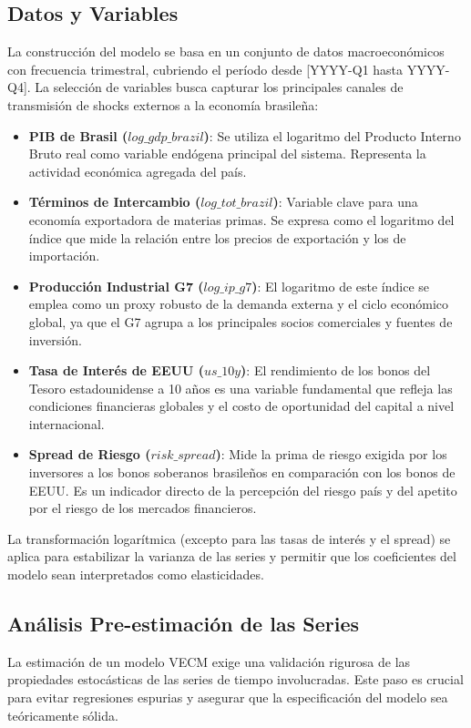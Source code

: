 \documentclass[12pt, a4paper]{article}
\begin{document}
\subsection{Datos y Variables}
La construcción del modelo se basa en un conjunto de datos macroeconómicos con frecuencia trimestral, cubriendo el período desde [YYYY-Q1 hasta YYYY-Q4]. La selección de variables busca capturar los principales canales de transmisión de shocks externos a la economía brasileña:
\begin{itemize}
    \item \textbf{PIB de Brasil ($log\_gdp\_brazil$)}: Se utiliza el logaritmo del Producto Interno Bruto real como variable endógena principal del sistema. Representa la actividad económica agregada del país.
    \item \textbf{Términos de Intercambio ($log\_tot\_brazil$)}: Variable clave para una economía exportadora de materias primas. Se expresa como el logaritmo del índice que mide la relación entre los precios de exportación y los de importación.
    \item \textbf{Producción Industrial G7 ($log\_ip\_g7$)}: El logaritmo de este índice se emplea como un proxy robusto de la demanda externa y el ciclo económico global, ya que el G7 agrupa a los principales socios comerciales y fuentes de inversión.
    \item \textbf{Tasa de Interés de EEUU ($us\_10y$)}: El rendimiento de los bonos del Tesoro estadounidense a 10 años es una variable fundamental que refleja las condiciones financieras globales y el costo de oportunidad del capital a nivel internacional.
    \item \textbf{Spread de Riesgo ($risk\_spread$)}: Mide la prima de riesgo exigida por los inversores a los bonos soberanos brasileños en comparación con los bonos de EEUU. Es un indicador directo de la percepción del riesgo país y del apetito por el riesgo de los mercados financieros.
\end{itemize}
La transformación logarítmica (excepto para las tasas de interés y el spread) se aplica para estabilizar la varianza de las series y permitir que los coeficientes del modelo sean interpretados como elasticidades.


\subsection{Análisis Pre-estimación de las Series}
La estimación de un modelo VECM exige una validación rigurosa de las propiedades estocásticas de las series de tiempo involucradas. Este paso es crucial para evitar regresiones espurias y asegurar que la especificación del modelo sea teóricamente sólida.
\end{document}

